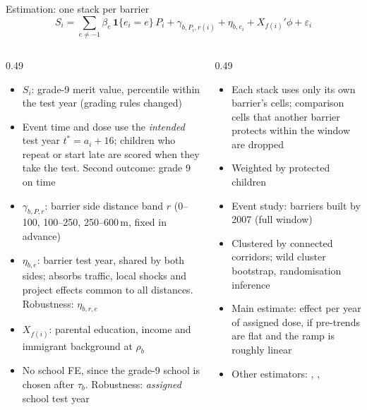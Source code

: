 \documentclass[aspectratio=169, 10pt]{beamer}
\begin{document}
\begin{frame}{Estimation: one stack per barrier}
\footnotesize
\vspace{-0.4em}
\[
S_i = \sum_{e \neq -1} \beta_e\, \mathbf{1}\{e_i = e\}\, P_i + \gamma_{b,P_i,r(i)} + \eta_{b,e_i} + X_{f(i)}'\phi + \varepsilon_i
\]
\vspace{-1.2em}
\begin{columns}[T]
\begin{column}{0.49\textwidth}
\begin{itemize}\setlength{\itemsep}{0pt}
  \item $S_i$: grade-9 merit value, percentile within the test year (grading rules changed)
  \item Event time and dose use the \emph{intended} test year $t^* = a_i + 16$; children who repeat or start late are scored when they take the test. Second outcome: grade 9 on time
  \item $\gamma_{b,P,r}$: barrier \texttimes{} side \texttimes{} distance band $r$ (0--100, 100--250, 250--600\,m, fixed in advance)
  \item $\eta_{b,e}$: barrier \texttimes{} test year, shared by both sides; absorbs traffic, local shocks and project effects common to all distances. Robustness: $\eta_{b,r,e}$
  \item $X_{f(i)}$: parental education, income and immigrant background at $\rho_b$
  \item No school FE, since the grade-9 school is chosen after $\tau_b$. Robustness: \emph{assigned} school \texttimes{} test year
\end{itemize}
\end{column}
\begin{column}{0.49\textwidth}
\begin{itemize}\setlength{\itemsep}{0pt}
  \item Each stack uses only its own barrier's cells; comparison cells that another barrier protects within the window are dropped \parencite{cengizEffectMinimumWages2019}
  \item Weighted by protected children \parencite{wingStackedDifferenceinDifferences2024}
  \item Event study: barriers built by 2007 (full window)
  \item Clustered by connected corridors; wild cluster bootstrap, randomisation inference
  \item Main estimate: effect per year of assigned dose, if pre-trends are flat and the ramp is roughly linear
  \item Other estimators: \textcite{callawayDifferenceinDifferencesMultipleTime2021}, \textcite{sunEstimatingDynamicTreatment2021}, \textcite{borusyakRevisitingEventStudyDesigns2024}
\end{itemize}
\end{column}
\end{columns}
\end{frame}
\end{document}
